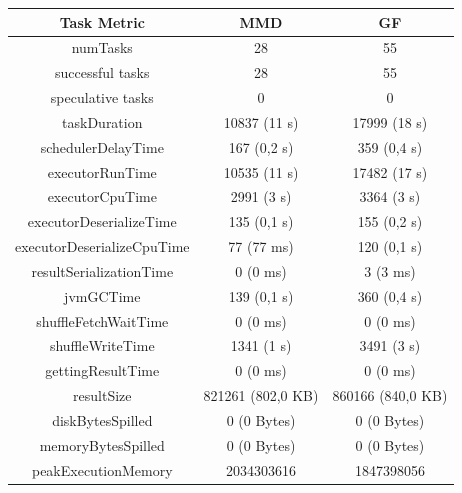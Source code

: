 \documentclass[a4paper,11pt, twoside]{article}
\begin{document}
            \begin{table}[h!]
                    \centering
            	\small
            	\begin{tabular}{ccc}
            		\toprule
            		  \textbf{Task Metric} & \textbf{MMD} & \textbf{GF} \\
            		\midrule
            		numTasks                    & 28                & 55 \\
                        successful tasks            & 28                & 55 \\
                        speculative tasks           & 0                 & 0 \\
                        taskDuration                & 10837 (11 s)      & 17999 (18 s) \\
                        schedulerDelayTime          & 167 (0,2 s)       & 359 (0,4 s) \\
                        executorRunTime             & 10535 (11 s)      & 17482 (17 s) \\
                        executorCpuTime             & 2991 (3 s)        & 3364 (3 s) \\ 
                        executorDeserializeTime     & 135 (0,1 s)       & 155 (0,2 s) \\
                        executorDeserializeCpuTime  & 77 (77 ms)        & 120 (0,1 s) \\
                        resultSerializationTime     & 0 (0 ms)          & 3 (3 ms) \\
                        jvmGCTime                   & 139 (0,1 s)       & 360 (0,4 s) \\
                        shuffleFetchWaitTime        & 0 (0 ms)          & 0 (0 ms)\\
                        shuffleWriteTime            & 1341 (1 s)        & 3491 (3 s) \\
                        gettingResultTime           & 0 (0 ms)          & 0 (0 ms) \\
                        resultSize                  & 821261 (802,0 KB) & 860166 (840,0 KB) \\
                        diskBytesSpilled            & 0 (0 Bytes)       & 0 (0 Bytes) \\
                        memoryBytesSpilled          & 0 (0 Bytes)       & 0 (0 Bytes) \\
                        peakExecutionMemory         & 2034303616        & 1847398056 \\

\end{tabular}
\end{table}
\end{document}

